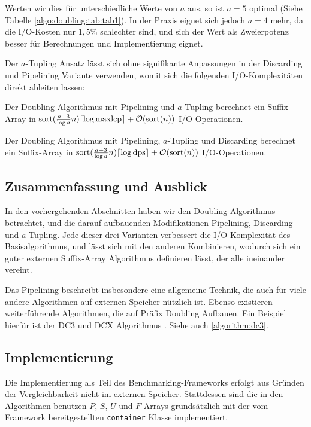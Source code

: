 Werten wir dies für unterschiedliche Werte von $a$ aus, so ist $a = 5$ optimal (Siehe Tabelle \ref{algo:doubling:tab:tab1}). In der Praxis eignet sich jedoch $a = 4$ mehr, da die I/O-Kosten nur $1,5\%$ schlechter sind, und sich der Wert als Zweierpotenz besser für Berechnungen und Implementierung eignet.

Der $a$-Tupling Ansatz lässt sich ohne signifikante Anpassungen in der Discarding und Pipelining Variante verwenden, womit sich die folgenden I/O-Komplexitäten direkt ableiten lassen:

\begin{theorem}
Der Doubling Algorithmus mit Pipelining und $a$-Tupling berechnet ein Suffix-Array in $\text{sort}(\frac{a + 3}{\log a}n) \ceil*{\log \text{maxlcp}} +  \mathcal{O}(\text{sort}(n))$ I/O-Operationen.
\end{theorem}

\begin{theorem}
Der Doubling Algorithmus mit Pipelining, $a$-Tupling und Discarding berechnet ein Suffix-Array in $\text{sort}(\frac{a + 3}{\log a}n) \ceil*{\log \text{dps}} +  \mathcal{O}(\text{sort}(n))$ I/O-Operationen.
\end{theorem}

\subsection{Zusammenfassung und Ausblick}
\label{algo:doubling:sec:summary}

In den vorhergehenden Abschnitten haben wir den Doubling Algorithmus betrachtet, und die darauf aufbauenden Modifikationen Pipelining, Discarding und $a$-Tupling. Jede dieser drei Varianten verbessert die I/O-Komplexität des Basisalgorithmus, und lässt sich mit den anderen Kombinieren, wodurch sich ein guter externen Suffix-Array Algorithmus definieren lässt, der alle ineinander vereint.

Das Pipelining beschreibt insbesondere eine allgemeine Technik, die auch für viele andere Algorithmen auf externen Speicher nützlich ist. Ebenso existieren weiterführende Algorithmen, die auf Präfix Doubling Aufbauen. Ein Beispiel hierfür ist der DC3 und DCX Algorithmus \cite{saca:11}. Siehe auch \cref{algorithm:dc3}.

\subsection{Implementierung}
Die Implementierung als Teil des Benchmarking-Frameworks erfolgt aus Gründen der Vergleichbarkeit nicht im externen Speicher. Stattdessen sind die in den Algorithmen benutzen $P$, $S$, $U$ und $F$ Arrays grundsätzlich mit der vom Framework bereitgestellten \texttt{container} Klasse implementiert.

